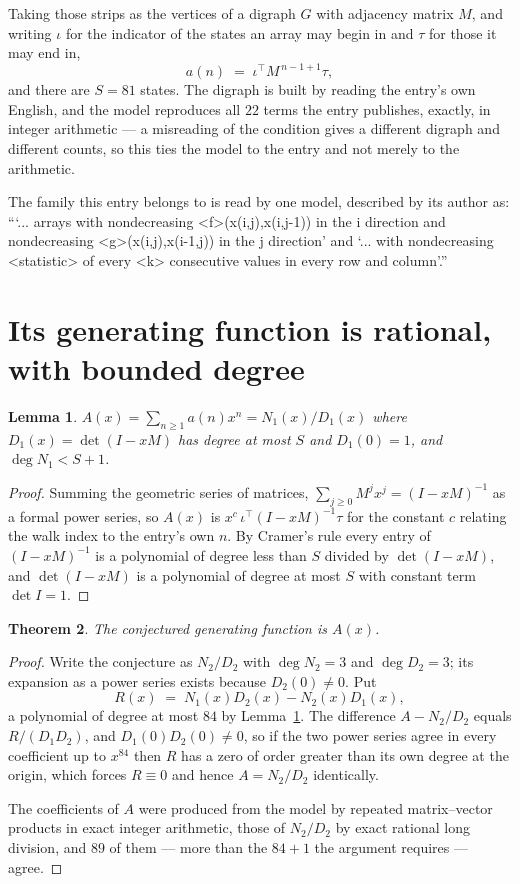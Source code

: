 \documentclass[11pt,a4paper]{article}
\theoremstyle{plain}
\newtheorem{theorem}{Theorem}
\newtheorem{lemma}[theorem]{Lemma}
\theoremstyle{definition}
\begin{document}
Taking those strips as the vertices of a digraph $G$ with adjacency matrix $M$, and writing
$\iota$ for the indicator of the states an array may begin in and $\tau$ for those it may end
in,
\[
a(n)\;=\;\iota^{\!\top}M^{\,n-1+1}\tau ,
\]
and there are $S=81$ states. The digraph is built by reading the entry's own English, and the
model reproduces all $22$ terms the entry publishes, exactly, in integer arithmetic --- a
misreading of the condition gives a different digraph and different counts, so this ties the
model to the entry and not merely to the arithmetic.

The family this entry belongs to is read by one model, described by its author as: ```... arrays with nondecreasing <f>(x(i,j),x(i,j-1)) in the i direction and nondecreasing <g>(x(i,j),x(i-1,j)) in the j direction' and `... with nondecreasing <statistic> of every <k> consecutive values in every row and column'.''


\section{Its generating function is rational, with bounded degree}

\begin{lemma}\label{lem:rat}
$A(x)=\sum_{n\ge1}a(n)x^n=N_1(x)/D_1(x)$ where $D_1(x)=\det(I-xM)$ has degree at most
$S$ and $D_1(0)=1$, and $\deg N_1<S+1$.
\end{lemma}

\begin{proof}
Summing the geometric series of matrices, $\sum_{j\ge0}M^jx^j=(I-xM)^{-1}$ as a formal
power series, so $A(x)$ is $x^{c}\,\iota^{\!\top}(I-xM)^{-1}\tau$ for the constant $c$
relating the walk index to the entry's own $n$. By Cramer's rule every entry of
$(I-xM)^{-1}$ is a polynomial of degree less than $S$ divided by $\det(I-xM)$, and
$\det(I-xM)$ is a polynomial of degree at most $S$ with constant term $\det I=1$.
\end{proof}

\begin{theorem}
The conjectured generating function is $A(x)$.
\end{theorem}

\begin{proof}
Write the conjecture as $N_2/D_2$ with $\deg N_2=3$ and $\deg D_2=3$; its expansion as a
power series exists because $D_2(0)\neq0$. Put
\[
R(x)\;=\;N_1(x)D_2(x)-N_2(x)D_1(x),
\]
a polynomial of degree at most $84$ by Lemma~\ref{lem:rat}. The difference
$A-N_2/D_2$ equals $R/(D_1D_2)$, and $D_1(0)D_2(0)\neq0$, so if the two power series agree in
every coefficient up to $x^{84}$ then $R$ has a zero of order greater than its own
degree at the origin, which forces $R\equiv0$ and hence $A=N_2/D_2$ identically.

The coefficients of $A$ were produced from the model by repeated matrix--vector products in
exact integer arithmetic, those of $N_2/D_2$ by exact rational long division, and $89$
of them --- more than the $84+1$ the argument requires --- agree.
\end{proof}
\end{document}

